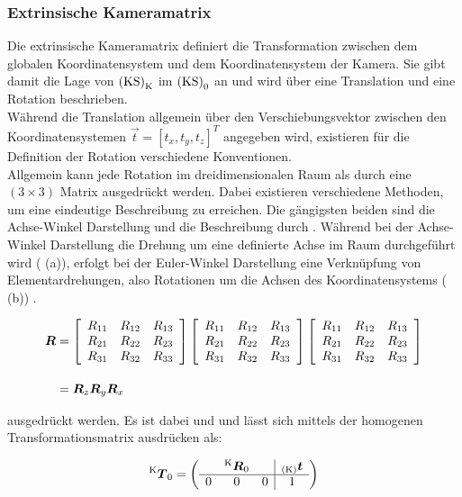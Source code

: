 \subsubsection{Extrinsische Kameramatrix}
Die extrinsische Kameramatrix definiert die Transformation zwischen dem globalen Koordinatensystem und dem Koordinatensystem der Kamera. Sie gibt damit die Lage von ${\mathrm{(KS)}}_{\mathrm{K}}$ im ${\mathrm{(KS)}}_{\mathrm{0}}$ an und wird über eine Translation und eine Rotation beschrieben.\\
Während die Translation allgemein über den Verschiebungsvektor zwischen den Koordinatensystemen $\vec{t} = [t_x, t_y, t_z]^T$ angegeben wird, existieren für die Definition der Rotation verschiedene Konventionen.\\
Allgemein kann jede Rotation im dreidimensionalen Raum als durch eine $(3 \times 3)$ Matrix ausgedrückt werden. Dabei existieren verschiedene Methoden, um eine eindeutige Beschreibung zu erreichen. Die gängigsten beiden sind die Achse-Winkel Darstellung und die Beschreibung durch . Während bei der Achse-Winkel Darstellung die Drehung um eine definierte Achse im Raum durchgeführt wird ( (a)), erfolgt bei der Euler-Winkel Darstellung eine Verknüpfung von Elementardrehungen, also Rotationen um die Achsen des Koordinatensystems ( (b)) \cite{Foley1990}. 

\begin{equation}
\begin{split}
\mbox{\boldmath{$R$}} & = \left[ \begin{array}{ccc} R_{11} & R_{12} & R_{13} \\ R_{21} & R_{22} & R_{23} \\ R_{31} & R_{32} & R_{33} \end{array} \right] \left[ \begin{array}{ccc} R_{11} & R_{12} & R_{13} \\ R_{21} & R_{22} & R_{23} \\ R_{31} & R_{32} & R_{33} \end{array} \right] \left[ \begin{array}{ccc} R_{11} & R_{12} & R_{13} \\ R_{21} & R_{22} & R_{23} \\ R_{31} & R_{32} & R_{33} \end{array} \right] \\[1em]
& = \mbox{\boldmath{$R$}}_z \mbox{\boldmath{$R$}}_y \mbox{\boldmath{$R$}}_x
\end{split}
\end{equation}

ausgedrückt werden. Es ist dabei 
und und lässt sich mittels der homogenen Transformationsmatrix \red[Quelle?] ausdrücken als:

\begin{equation}
{^{\mathrm{K}}\mbox{\boldmath{$T$}}_{\mathrm{0}}} = \left( \begin{array}{ccc|c}
  & {^{\mathrm{K}}\mbox{\boldmath{$R$}}_{\mathrm{0}}} &   & {_{{\mathrm{(K)}}}}\mbox{\boldmath{$t$}} \\
\hline
0 &      0      & 0 & 1 \\
\end{array} \right)
\end{equation}
